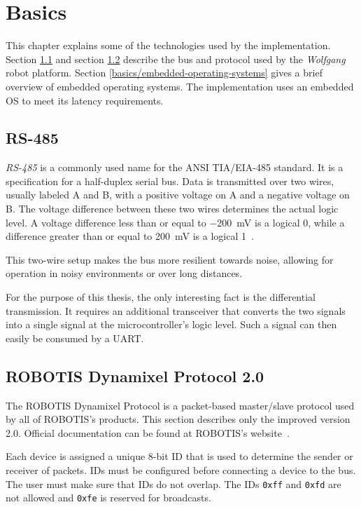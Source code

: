 \chapter{Basics}
\label{basics}

This chapter explains some of the technologies used by the implementation. Section \ref{basics/rs-485}
and section \ref{basics/dynamixel-protocol} describe the bus and protocol used by the \textit{Wolfgang}
robot platform. Section \ref{basics/embedded-operating-systems} gives a brief overview of embedded
operating systems. The implementation uses an embedded OS to meet its latency requirements.

\section{RS-485}
\label{basics/rs-485}

\textit{RS-485} is a commonly used name for the ANSI TIA/EIA-485 standard. It is a specification for
a half-duplex serial bus. Data is transmitted over two wires, usually labeled A and B, with a positive
voltage on A and a negative voltage on B. The voltage difference between these two wires determines
the actual logic level. A voltage difference less than or equal to \SI{-200}{\milli\volt} is a logical
0, while a difference greater than or equal to \SI{200}{\milli\volt} is a logical 1~\cite{rs-485-overview}.

This two-wire setup makes the bus more resilient towards noise, allowing for operation in noisy
environments or over long distances.

For the purpose of this thesis, the only interesting fact is the differential transmission. It requires
an additional transceiver that converts the two signals into a single signal at the microcontroller's
logic level. Such a signal can then easily be consumed by a UART.

\section{ROBOTIS Dynamixel Protocol 2.0}
\label{basics/dynamixel-protocol}

The ROBOTIS Dynamixel Protocol is a packet-based master/slave protocol used by all of ROBOTIS's products.
This section describes only the improved version 2.0. Official documentation can be found at ROBOTIS's
website~\cite{dynamixel-protocol-2}.

Each device is assigned a unique 8-bit ID that is used to determine the sender or receiver of packets.
IDs must be configured before connecting a device to the bus. The user must make sure that IDs do not
overlap. The IDs \lstinline{0xff} and \lstinline{0xfd} are not allowed and \lstinline{0xfe} is reserved
for broadcasts.

